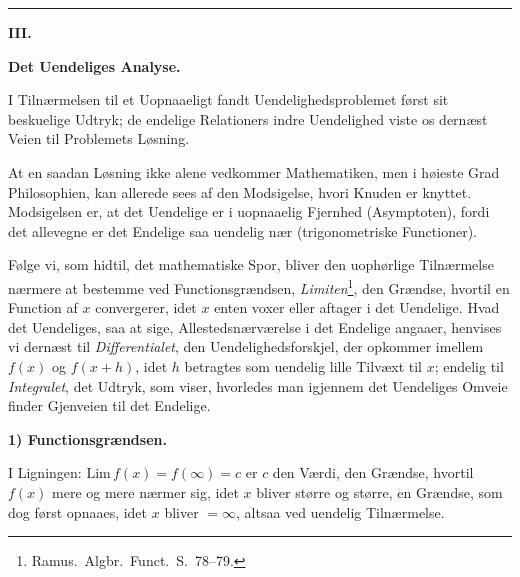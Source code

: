 \documentclass[12pt]{book}
\newcommand{\opage}[1]{\marginnote{\footnotesize\textit{[#1]}}}
\begin{document}
\begin{center}\rule{2.5cm}{0.4pt}\end{center}

\begin{center}
  {\large\bfseries III.}\par\vspace{4pt}
  {\Large\bfseries Det Uendeliges Analyse.}
\end{center}
{}

I Tilnærmelsen til et Uopnaaeligt fandt Uendelighedsproblemet først sit beskuelige
Udtryk; de endelige Relationers
\opage{47} indre Uendelighed viste os dernæst Veien til Problemets Løsning.

At en saadan Løsning ikke alene vedkommer Mathematiken, men i høieste Grad
Philosophien, kan allerede sees af den Modsigelse, hvori Knuden er knyttet.
Modsigelsen er, at det Uendelige er i uopnaaelig Fjernhed (Asymptoten), fordi det
allevegne er det Endelige saa uendelig nær (trigonometriske Functioner).

Følge vi, som hidtil, det mathematiske Spor, bliver den uophørlige Tilnærmelse
nærmere at bestemme ved Functionsgrændsen, \emph{Limiten}\footnote{Ramus.\ Algbr.\
Funct.\ S.\ 78--79.}, den Grændse, hvortil en Function af $x$ convergerer, idet
$x$ enten voxer eller aftager i det Uendelige. Hvad det Uendeliges, saa at sige,
Allestedsnærværelse i det Endelige angaaer, henvises vi dernæst til
\emph{Differentialet}, den Uendelighedsforskjel, der opkommer imellem $f(x)$ og
$f(x+h)$, idet $h$ betragtes som uendelig lille Tilvæxt til $x$; endelig til
\emph{Integralet}, det Udtryk, som viser, hvorledes man igjennem det Uendeliges
Omveie finder Gjenveien til det Endelige.

\begin{center}
\textbf{1) Functionsgrændsen.}
\end{center}
{}

I Ligningen: $\mathrm{Lim}\, f(x) = f(\infty) = c$ er $c$ den Værdi, den Grændse,
hvortil $f(x)$ mere og mere nærmer sig, idet $x$ bliver større og større, en
Grændse, som dog først opnaaes, idet $x$ bliver $= \infty$, altsaa ved uendelig
Tilnærmelse.
\end{document}
